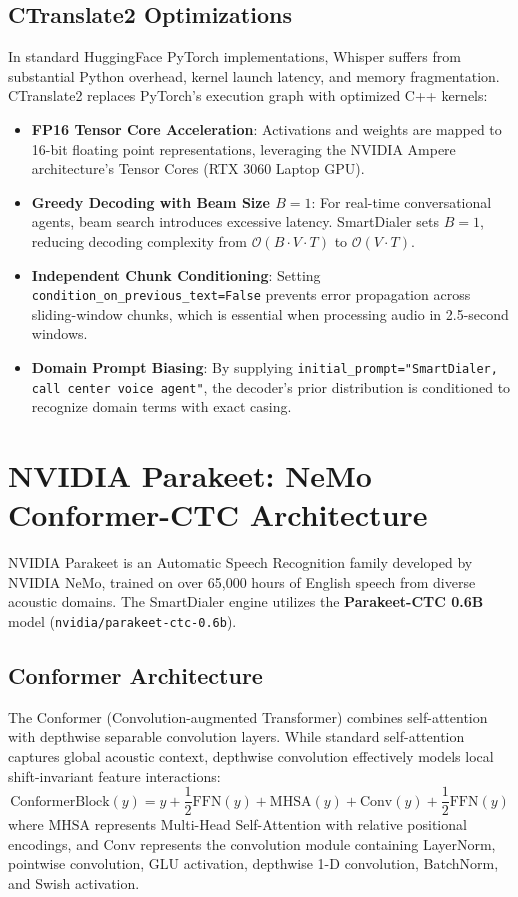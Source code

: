\documentclass[11pt,a4paper,titlepage]{report}
\begin{document}
\subsection{CTranslate2 Optimizations}
In standard HuggingFace PyTorch implementations, Whisper suffers from substantial Python overhead, kernel launch latency, and memory fragmentation. CTranslate2 replaces PyTorch's execution graph with optimized C++ kernels:
\begin{itemize}
    \item \textbf{FP16 Tensor Core Acceleration}: Activations and weights are mapped to 16-bit floating point representations, leveraging the NVIDIA Ampere architecture's Tensor Cores (RTX 3060 Laptop GPU).
    \item \textbf{Greedy Decoding with Beam Size $B=1$}: For real-time conversational agents, beam search introduces excessive latency. SmartDialer sets $B=1$, reducing decoding complexity from $\mathcal{O}(B \cdot V \cdot T)$ to $\mathcal{O}(V \cdot T)$.
    \item \textbf{Independent Chunk Conditioning}: Setting \texttt{condition\_on\_previous\_text=False} prevents error propagation across sliding-window chunks, which is essential when processing audio in 2.5-second windows.
    \item \textbf{Domain Prompt Biasing}: By supplying \texttt{initial\_prompt="SmartDialer, call center voice agent"}, the decoder's prior distribution is conditioned to recognize domain terms with exact casing.
\end{itemize}

\section{NVIDIA Parakeet: NeMo Conformer-CTC Architecture}
NVIDIA Parakeet is an Automatic Speech Recognition family developed by NVIDIA NeMo, trained on over 65,000 hours of English speech from diverse acoustic domains. The SmartDialer engine utilizes the \textbf{Parakeet-CTC 0.6B} model (\texttt{nvidia/parakeet-ctc-0.6b}).

\subsection{Conformer Architecture}
The Conformer (Convolution-augmented Transformer) combines self-attention with depthwise separable convolution layers. While standard self-attention captures global acoustic context, depthwise convolution effectively models local shift-invariant feature interactions:
\begin{equation}
    \text{ConformerBlock}(y) = y + \frac{1}{2}\text{FFN}(y) + \text{MHSA}(y) + \text{Conv}(y) + \frac{1}{2}\text{FFN}(y)
\end{equation}
where $\text{MHSA}$ represents Multi-Head Self-Attention with relative positional encodings, and $\text{Conv}$ represents the convolution module containing LayerNorm, pointwise convolution, GLU activation, depthwise 1-D convolution, BatchNorm, and Swish activation.
\end{document}
